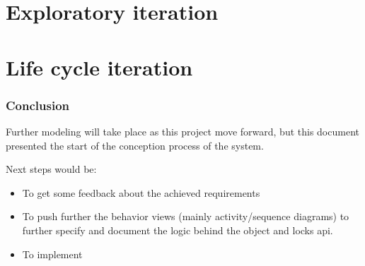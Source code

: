 \documentclass[a4paper,11pt]{article}
\author{%
    Léo-Nils Boissier \\
    \url{github.com/leonils}
}
\begin{document}


\tableofcontents
\newpage


\part{Exploratory iteration}







\newpage
\part{Life cycle iteration}








\section{Conclusion}
Further modeling will take place as this project move forward, but this document presented the start of the conception process of the system.

Next steps would be:

\begin{itemize}
    \item To get some feedback about the achieved requirements
    \item To push further the behavior views (mainly activity/sequence diagrams) to further specify and document the logic behind the object and locks api.
    \item To implement
\end{itemize}
\end{document}
